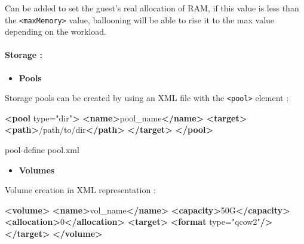 \documentclass[
  14pt,
  english,
  a4paper,
]{scrreprt}
\newenvironment{Shaded}{}{}
\newcommand{\ExtensionTok}[1]{#1}
\newcommand{\KeywordTok}[1]{\textcolor[rgb]{0.00,0.44,0.13}{\textbf{#1}}}
\newcommand{\NormalTok}[1]{#1}
\newcommand{\OtherTok}[1]{\textcolor[rgb]{0.00,0.44,0.13}{#1}}
\newcommand{\StringTok}[1]{\textcolor[rgb]{0.25,0.44,0.63}{#1}}
\providecommand{\tightlist}{%
  \setlength{\itemsep}{0pt}\setlength{\parskip}{0pt}}
\begin{document}
Can be added to set the guest's real allocation of RAM, if this value is
less than the \texttt{\textless{}maxMemory\textgreater{}} value,
ballooning will be able to rise it to the max value depending on the
workload.

\hypertarget{storage-2}{%
\paragraph*{Storage :}\label{storage-2}}

\begin{itemize}
\tightlist
\item
  \textbf{Pools}
\end{itemize}

Storage pools can be created by using an XML file with the
\texttt{\textless{}pool\textgreater{}} element :

\begin{Shaded}
\begin{Highlighting}[]
\KeywordTok{\textless{}pool}\OtherTok{ type=}\StringTok{"dir"}\KeywordTok{\textgreater{}}
  \KeywordTok{\textless{}name\textgreater{}}\NormalTok{pool\_name}\KeywordTok{\textless{}/name\textgreater{}}
  \KeywordTok{\textless{}target\textgreater{}}
    \KeywordTok{\textless{}path\textgreater{}}\NormalTok{/path/to/dir}\KeywordTok{\textless{}/path\textgreater{}}
  \KeywordTok{\textless{}/target\textgreater{}}
\KeywordTok{\textless{}/pool\textgreater{}}
\end{Highlighting}
\end{Shaded}

\begin{Shaded}
\begin{Highlighting}[]
\ExtensionTok{pool{-}define}\NormalTok{ pool.xml}
\end{Highlighting}
\end{Shaded}

\begin{itemize}
\tightlist
\item
  \textbf{Volumes}
\end{itemize}

Volume creation in XML representation :

\begin{Shaded}
\begin{Highlighting}[]
\KeywordTok{\textless{}volume\textgreater{}}
  \KeywordTok{\textless{}name\textgreater{}}\NormalTok{vol\_name}\KeywordTok{\textless{}/name\textgreater{}}
  \KeywordTok{\textless{}capacity\textgreater{}}\NormalTok{50G}\KeywordTok{\textless{}/capacity\textgreater{}}
  \KeywordTok{\textless{}allocation\textgreater{}}\NormalTok{0}\KeywordTok{\textless{}/allocation\textgreater{}}
  \KeywordTok{\textless{}target\textgreater{}}
    \KeywordTok{\textless{}format}\OtherTok{ type=}\StringTok{"qcow2"}\KeywordTok{/\textgreater{}}
  \KeywordTok{\textless{}/target\textgreater{}}
\KeywordTok{\textless{}/volume\textgreater{}}
\end{Highlighting}
\end{Shaded}
\end{document}
